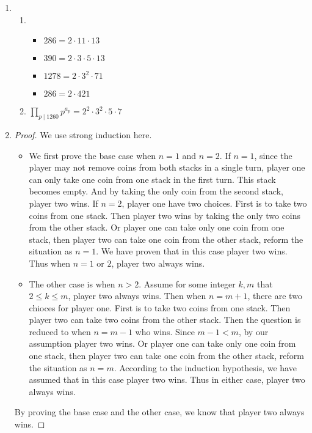 \documentclass[11pt,a4paper]{article}
\begin{document}
\begin{enumerate}
	\item
	 	\begin{enumerate}
	 		\item
			\begin{itemize}
				\item $286 = 2 \cdot 11 \cdot 13$
				\item $390 = 2 \cdot 3 \cdot 5 \cdot 13$
				\item $1278 = 2 \cdot 3^2 \cdot 71$
				\item $286 = 2 \cdot 421$
			\end{itemize}

			\item \( \prod\limits_{p \mid 1260} p^{a_{p}} = 2^2 \cdot 3^2 \cdot 5 \cdot 7\)
	 	\end{enumerate}

	\item \begin{proof} We use strong induction here.
		\begin{itemize}
			\item We first prove the base case when $n=1$ and $n=2$. If $n=1$, since the player may not remove coins from both stacks in a single turn, player one can only take one coin from one stack in the first turn. This stack becomes empty. And by taking the only coin from the second stack, player two wins. If $n=2$, player one have two choices. First is to take two coins from one stack. Then player two wins by taking the only two coins from the other stack. Or player one can take only one coin from one stack, then player two can take one coin from the other stack, reform the situation as $n=1$. We have proven that in this case player two wins. Thus when $n=1$ or $2$, player two always wins.
			\item The other case is when $n>2$. Assume for some integer $k, m$ that $2\leq k \leq m$,  player two always wins. Then when $n=m+1$, there are two chioces for player one. First is to take two coins from one stack. Then player two can take two coins from the other stack. Then the question is reduced to when $n=m-1$ who wins. Since $m-1<m$, by our assumption player two wins. Or player one can take only one coin from one stack, then player two can take one coin from the other stack, reform the situation as $n=m$. According to the induction hypothesis, we have assumed that in this case player two wins. Thus in either case, player two always wins.
		\end{itemize} By proving the base case and the other case, we know that player two always wins. \end{proof}


\end{enumerate}
\end{document}
